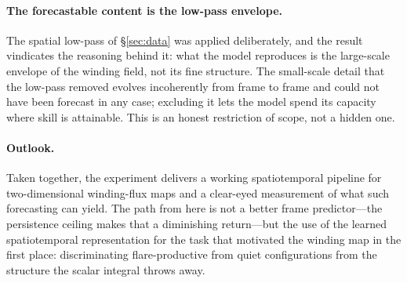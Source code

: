 \paragraph{The forecastable content is the low-pass envelope.}
The spatial low-pass of \S\ref{sec:data} was applied deliberately, and the
result vindicates the reasoning behind it: what the model reproduces is the
large-scale envelope of the winding field, not its fine structure. The
small-scale detail that the low-pass removed evolves incoherently from frame to
frame and could not have been forecast in any case; excluding it lets the model
spend its capacity where skill is attainable. This is an honest restriction of
scope, not a hidden one.

\paragraph{Outlook.}
Taken together, the experiment delivers a working spatiotemporal pipeline for
two-dimensional winding-flux maps and a clear-eyed measurement of what such
forecasting can yield. The path from here is not a better frame predictor---the
persistence ceiling makes that a diminishing return---but the use of the learned
spatiotemporal representation for the task that motivated the winding map in the
first place: discriminating flare-productive from quiet configurations from the
structure the scalar integral throws away.
